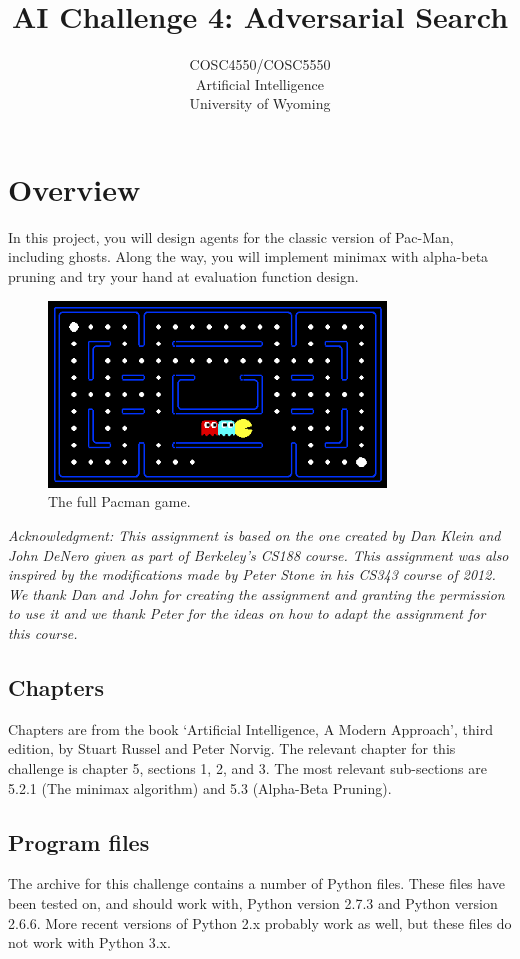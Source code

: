 \documentclass{article}
\title{AI Challenge 4: Adversarial Search}
\date{}
\author{COSC4550/COSC5550\\
Artificial Intelligence\\
University of Wyoming}
\begin{document}
\maketitle




\section{Overview}
In this project, you will design agents for the classic version of Pac-Man, including ghosts. Along the way, you will implement minimax with alpha-beta pruning and try your hand at evaluation function design.

\begin{figure}[h]
\centering
\includegraphics[width=0.8\textwidth]{pacman_multi_agent.png}
\caption{The full Pacman game.}
\label{fig:screen}
\end{figure}

\noindent
\textit{Acknowledgment: This assignment is based on the one created by Dan Klein and John DeNero given as part of Berkeley's CS188 course. This assignment was also inspired by the modifications made by Peter Stone in his CS343 course of 2012. 
We thank Dan and John for creating the assignment and granting the permission to use it and we thank Peter for the ideas on how to adapt the assignment for this course.}


\newpage
\subsection{Chapters}
Chapters are from the book `Artificial Intelligence, A Modern Approach', third edition, by Stuart Russel and Peter Norvig. The relevant chapter for this challenge is chapter 5, sections 1, 2, and 3. The most relevant sub-sections are 5.2.1 (The minimax algorithm) and 5.3 (Alpha-Beta Pruning).


\subsection{Program files}
The archive for this challenge contains a number of Python files. These files have been tested on, and should work with, Python version 2.7.3 and Python version 2.6.6. More recent versions of Python 2.x probably work as well, but these files do not work with Python 3.x.
\end{document}
